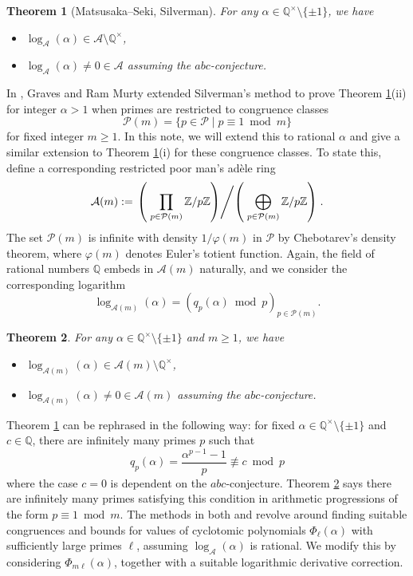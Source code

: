 \documentclass[12pt,reqno]{amsart}
\newtheorem{theorem}{Theorem}[section]
\theoremstyle{remark}
\newcommand{\cA}{\mathcal A}
\newcommand{\cP}{\mathcal P}
\begin{document}
\begin{theorem}[Matsusaka--Seki, Silverman]\label{MSS}
For any $\alpha\in\mathbb{Q}^\times\setminus\{\pm 1\}$, we have 
\begin{itemize}
\item[(i)]
$\log_\cA(\alpha)\in\cA\setminus\mathbb{Q}^{\times}$, 
\item[(ii)]
$\log_\cA(\alpha)\neq 0\in\cA$ assuming the $abc$-conjecture.
\end{itemize}
\end{theorem}
In \cite{GRM13}, Graves and Ram Murty extended Silverman's method to prove Theorem \ref{MSS}(ii) for integer $\alpha>1$ when primes are restricted to congruence classes 
\[\cP(m)=\{p\in\cP\;|\; p\equiv 1\bmod m\}\]
for fixed integer $m\geq 1$. In this note, we will extend this to rational $\alpha$ and give a similar extension to Theorem \ref{MSS}(i) for these congruence classes. 
To state this, define a corresponding restricted poor man's ad\`{e}le ring
\[\cA(m):=\left.\left(\;\prod_{p\in\cP(m)}\mathbb{Z}/p\mathbb{Z}\right) \middle/ \left(\;\bigoplus_{p\in\cP(m)}\mathbb{Z}/p\mathbb{Z}\right)\right..\]
The set $\cP(m)$ is infinite with density $1/\varphi(m)$ in $\cP$ by Chebotarev's density theorem, where $\varphi(m)$ denotes Euler's totient function. 
Again, the field of rational numbers $\mathbb{Q}$ embeds in $\cA(m)$ naturally, and we consider the corresponding logarithm 
\[\log_{\cA(m)}(\alpha)=(q_p(\alpha)\bmod p)_{p\in\cP(m)}.\]
\begin{theorem}\label{logAm}
For any $\alpha\in\mathbb{Q}^\times\setminus\{\pm 1\}$ and $m\geq 1$, we have
\begin{itemize}
\item[(i)]
$\log_{\cA(m)}(\alpha)\in\cA(m)\setminus\mathbb{Q}^{\times}$, 
\item[(ii)]
$\log_{\cA(m)}(\alpha)\neq 0\in\cA(m)$ assuming the $abc$-conjecture.
\end{itemize}
\end{theorem}
Theorem \ref{MSS} can be rephrased in the following way: for fixed $\alpha\in\mathbb{Q}^\times\setminus\{\pm 1\}$ and $c\in\mathbb{Q}$, there are infinitely many primes $p$ such that 
\[q_p(\alpha)=\frac{\alpha^{p-1}-1}{p}\not\equiv c\bmod p\]
where the case $c=0$ is dependent on the $abc$-conjecture. Theorem \ref{logAm} says there are infinitely many primes satisfying this condition in arithmetic progressions of the form $p\equiv 1\bmod m$. 
The methods in both \cite{MS26} and \cite{Si88} revolve around finding suitable congruences and bounds for values of cyclotomic polynomials $\Phi_\ell(\alpha)$ with sufficiently large primes $\ell$, assuming $\log_\cA(\alpha)$ is rational. We modify this by considering $\Phi_{m\ell}(\alpha)$, together with a suitable logarithmic derivative correction.
\smallskip
\end{document}

